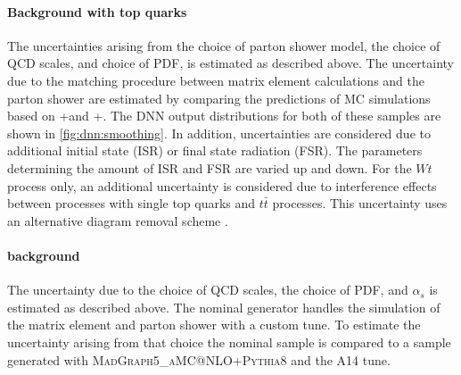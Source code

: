 \paragraph{Background with top quarks}
The uncertainties arising from the choice of parton shower model, the choice of QCD scales, and choice of PDF, is estimated as described above. 
The uncertainty due to the matching procedure between matrix element calculations and the parton shower are estimated by comparing the predictions of MC simulations based on \Powheg+\PythiaEight and \aMCATNLO+\PythiaEight. 
The DNN output distributions for both of these samples are shown in \cref{fig:dnn:smoothing}. 
In addition, uncertainties are considered due to additional initial state (ISR) or final state radiation (FSR). The parameters determining the amount of ISR and FSR are varied up and down.
For the $Wt$ process only, an additional uncertainty is considered due to interference effects between processes with single top quarks and $t\bar{t}$ processes. This uncertainty uses an alternative diagram removal scheme \cite{Frixione:2008yi}. %


\paragraph{\Ztautau background}
The uncertainty due to the choice of QCD scales, the choice of PDF, and  $\alpha_s$ is estimated as described above. 
The nominal  generator handles the simulation of the matrix element and parton shower with a custom tune. To estimate the uncertainty arising from that choice the nominal sample is compared to a sample generated with \textsc{MadGraph5\_aMC@NLO+Pythia8} and the A14 tune. 


